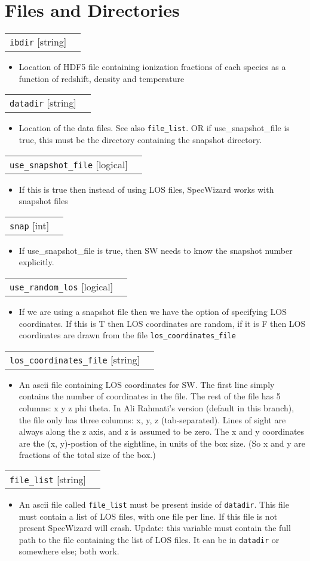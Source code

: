\documentclass{report}
\makeatletter
\newcommand{\paramdefinition}[3]{
\begin{tabular*}{\textwidth}{l@{\extracolsep{\fill}}r}
		{\tt #1} [{\sc #2}]& #3 \\
\end{tabular*}}
\newcommand{\paramdescription}[1]{
\begin{itemize}
\item #1
\end{itemize}\vspace{0.2cm}}
\newcommand{\param}[1]{{\tt #1}}
\makeatother
\begin{document}
\section{Files and Directories}

\paramdefinition{ibdir}{string}{}
\paramdescription{Location of HDF5 file containing ionization fractions of each species as a function of redshift, density and temperature}

\paramdefinition{datadir}{string}{}
\paramdescription{Location of the data files.  See also \param{file\_list}.
OR if use\_snapshot\_file is true, this must be the directory containing the snapshot directory.}

\paramdefinition{use\_snapshot\_file}{logical}{}
\paramdescription{If this is true then instead of using LOS files, SpecWizard works with snapshot files}

\paramdefinition{snap}{int}{}
\paramdescription{If use\_snapshot\_file is true, then SW needs to know the snapshot number explicitly.}

\paramdefinition{use\_random\_los}{logical}{}
\paramdescription{If we are using a snapshot file then we have the option of specifying LOS coordinates.  If this is T then LOS coordinates are random, if it is F then LOS coordinates are drawn from the file {\tt los\_coordinates\_file}}

\paramdefinition{los\_coordinates\_file}{string}{}
\paramdescription{An ascii file containing LOS coordinates for SW. The first line simply contains the number of coordinates in the file. The rest of the file has 5 columns: x y z phi theta. In Ali Rahmati's version (default in this branch), the file only has three columns: x, y, z (tab-separated). Lines of sight are always along the z axis, and z is assumed to be zero. The x and y coordinates are the (x, y)-postion of the sightline, in units of the box size. (So x and y are fractions of the total size of the box.)}

\paramdefinition{file\_list}{string}{}
\paramdescription{An ascii file called {\tt file\_list} must be present inside of {\tt datadir}.  This file must contain a list of LOS files, with one file per line.  If this file is not present SpecWizard will crash. Update: this variable must contain the full path to the file containing the list of LOS files. It can be in \param{datadir} or somewhere else; both work.}
\end{document}
